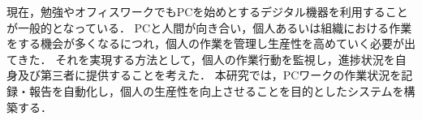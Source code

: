 現在，勉強やオフィスワークでもPCを始めとするデジタル機器を利用することが一般的となっている．
PCと人間が向き合い，個人あるいは組織における作業をする機会が多くなるにつれ，個人の作業を管理し生産性を高めていく必要が出てきた．
それを実現する方法として，個人の作業行動を監視し，進捗状況を自身及び第三者に提供することを考えた．
本研究では，PCワークの作業状況を記録・報告を自動化し，個人の生産性を向上させることを目的としたシステムを構築する．
